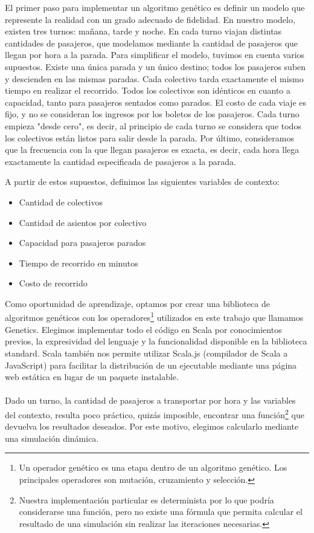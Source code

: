\documentclass{conaiisi}
\begin{document}
\begin{multicols}{2}
{El primer paso para implementar un algoritmo genético es definir un modelo que represente la realidad con un grado adecuado de fidelidad.
En nuestro modelo, existen tres turnos: mañana, tarde y noche.
En cada turno viajan distintas cantidades de pasajeros, que modelamos mediante la cantidad de pasajeros que llegan por hora a la parada.
Para simplificar el modelo, tuvimos en cuenta varios supuestos.
Existe una única parada y un único destino; todos los pasajeros suben y descienden en las mismas paradas.
Cada colectivo tarda exactamente el mismo tiempo en realizar el recorrido.
Todos los colectivos son idénticos en cuanto a capacidad, tanto para pasajeros sentados como parados.
El costo de cada viaje es fijo, y no se consideran los ingresos por los boletos de los pasajeros.
Cada turno empieza "desde cero", es decir, al principio de cada turno se considera que todos los colectivos están listos para salir desde la parada.
Por último, consideramos que la frecuencia con la que llegan pasajeros es exacta, es decir, cada hora llega exactamente la cantidad especificada de pasajeros a la parada.

A partir de estos supuestos, definimos las siguientes variables de contexto:

\begin{itemize}
	\item Cantidad de colectivos
	\item Cantidad de asientos por colectivo
	\item Capacidad para pasajeros parados
	\item Tiempo de recorrido en minutos
	\item Costo de recorrido
\end{itemize}
}

Como oportunidad de aprendizaje, optamos por crear una biblioteca de algoritmos genéticos con los operadores\footnote{Un operador genético es una etapa dentro de un algoritmo genético. Los principales operadores son mutación, cruzamiento y selección.} utilizados en este trabajo que llamamos Genetics\cite{genetics}.
Elegimos implementar todo el código en Scala por conocimientos previos, la expresividad del lenguaje y la funcionalidad disponible en la biblioteca standard.
Scala también nos permite utilizar Scala.js\cite{scalajs} (compilador de Scala a JavaScript) para facilitar la distribución de un ejecutable mediante una página web estática en lugar de un paquete instalable.

\paragraph{}
Dado un turno, la cantidad de pasajeros a transportar por hora y las variables del contexto, resulta poco práctico, quizás imposible, encontrar una función\footnote{Nuestra implementación particular es determinista por lo que podría considerarse una función, pero no existe una fórmula que permita calcular el resultado de una simulación sin realizar las iteraciones necesarias.} que devuelva los resultados deseados.
Por este motivo, elegimos calcularlo mediante una simulación dinámica.


\end{multicols}
\end{document}
